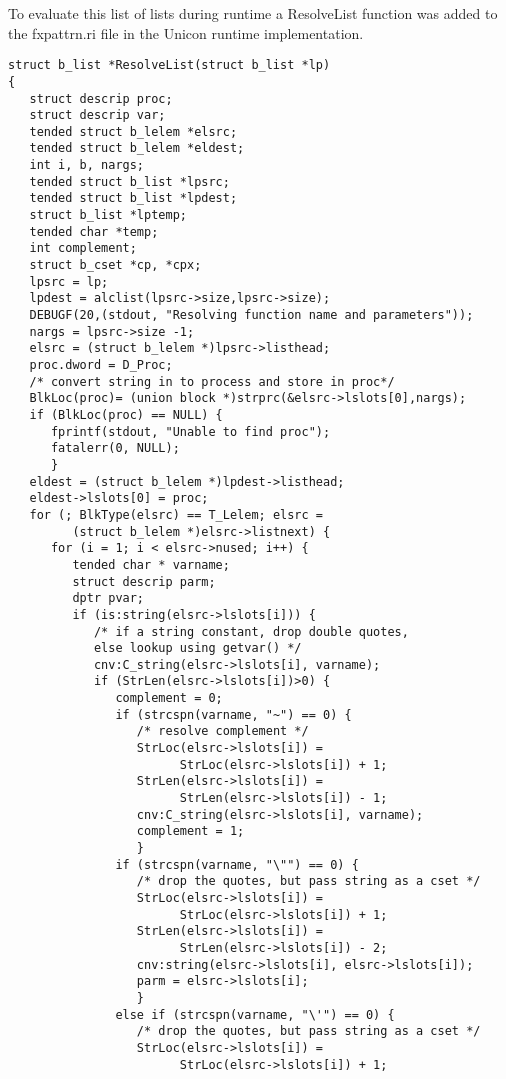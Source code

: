 \documentclass{article}
\begin{document}
To evaluate this list of lists during runtime a ResolveList function was added to the fxpattrn.ri file in the Unicon runtime implementation.  
\begin{verbatim}
struct b_list *ResolveList(struct b_list *lp)
{
   struct descrip proc;
   struct descrip var;
   tended struct b_lelem *elsrc;
   tended struct b_lelem *eldest;
   int i, b, nargs;
   tended struct b_list *lpsrc;
   tended struct b_list *lpdest;
   struct b_list *lptemp;
   tended char *temp;
   int complement;
   struct b_cset *cp, *cpx;
   lpsrc = lp;
   lpdest = alclist(lpsrc->size,lpsrc->size);
   DEBUGF(20,(stdout, "Resolving function name and parameters"));
   nargs = lpsrc->size -1;
   elsrc = (struct b_lelem *)lpsrc->listhead;
   proc.dword = D_Proc;
   /* convert string in to process and store in proc*/
   BlkLoc(proc)= (union block *)strprc(&elsrc->lslots[0],nargs);
   if (BlkLoc(proc) == NULL) {
      fprintf(stdout, "Unable to find proc");
      fatalerr(0, NULL);
      }
   eldest = (struct b_lelem *)lpdest->listhead;
   eldest->lslots[0] = proc;
   for (; BlkType(elsrc) == T_Lelem; elsrc = 
         (struct b_lelem *)elsrc->listnext) {
      for (i = 1; i < elsrc->nused; i++) {
         tended char * varname;
         struct descrip parm;
         dptr pvar;
         if (is:string(elsrc->lslots[i])) {
            /* if a string constant, drop double quotes,
            else lookup using getvar() */
            cnv:C_string(elsrc->lslots[i], varname);
            if (StrLen(elsrc->lslots[i])>0) {
               complement = 0;
               if (strcspn(varname, "~") == 0) {
                  /* resolve complement */
                  StrLoc(elsrc->lslots[i]) = 
                        StrLoc(elsrc->lslots[i]) + 1;
                  StrLen(elsrc->lslots[i]) = 
                        StrLen(elsrc->lslots[i]) - 1;
                  cnv:C_string(elsrc->lslots[i], varname);
                  complement = 1;
                  }
               if (strcspn(varname, "\"") == 0) {
                  /* drop the quotes, but pass string as a cset */
                  StrLoc(elsrc->lslots[i]) = 
                        StrLoc(elsrc->lslots[i]) + 1;
                  StrLen(elsrc->lslots[i]) = 
                        StrLen(elsrc->lslots[i]) - 2;
                  cnv:string(elsrc->lslots[i], elsrc->lslots[i]);
                  parm = elsrc->lslots[i];
                  }
               else if (strcspn(varname, "\'") == 0) { 
                  /* drop the quotes, but pass string as a cset */
                  StrLoc(elsrc->lslots[i]) = 
                        StrLoc(elsrc->lslots[i]) + 1;

\end{verbatim}
\end{document}
